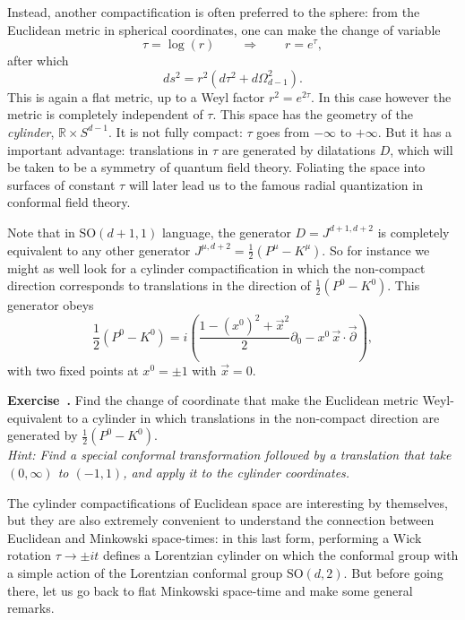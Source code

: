 \documentclass[a4paper,12pt]{article}
\numberwithin{equation}{section}
\newcounter{exercise}[section]
\newenvironment{exercise}[1][]%
	{\refstepcounter{exercise}\bigskip
	\begin{mdframed}[backgroundcolor=gray!20, linewidth=0]
	\noindent\textbf{Exercise~\thesection.\theexercise #1} \rmfamily}
  	{\end{mdframed}\bigskip}
\newcommand\hint[1]{\emph{Hint: #1}}
\begin{document}
Instead, another compactification is often preferred to the sphere: from the Euclidean metric in spherical coordinates, one can make the change of variable
\begin{equation}
	\tau = \log(r)
	\qquad\Rightarrow\qquad
	r = e^\tau,
\end{equation}
after which
\begin{equation}
	ds^2 = r^2 \left( d\tau^2 + d\Omega_{d-1}^2 \right).
\end{equation}
This is again a flat metric, up to a Weyl factor $r^2 = e^{2\tau}$. In this case however the metric is completely independent of $\tau$.
This space has the geometry of the \emph{cylinder}, $\mathds{R} \times S^{d-1}$. It is not fully compact: $\tau$ goes from $-\infty$ to $+\infty$. But it has a important advantage: translations in $\tau$ are generated by dilatations $D$, which will be taken to be a symmetry of quantum field theory. Foliating the space into surfaces of constant $\tau$ will later lead us to the famous radial quantization in conformal field theory.

Note that in $\text{SO}(d + 1, 1)$ language, the generator $D = J^{d+1, d+2}$ is completely equivalent to any other generator $J^{\mu, d+2} = \frac{1}{2} \left( P^\mu - K^\mu \right)$. So for instance we might as well look for a cylinder compactification in which the non-compact direction corresponds to translations in the direction of
$\frac{1}{2} \left( P^0 - K^0 \right)$. This generator obeys
\begin{equation}
	\frac{1}{2} \left( P^0 - K^0 \right)
	= i \left( \frac{1 - (x^0)^2 + \vec{x}^2}{2} \partial_0
	- x^0 \, \vec{x} \cdot \vec{\partial} \right),
\end{equation}
with two fixed points at $x^0 = \pm 1$ with $\vec{x} = 0$.

\begin{exercise}
	Find the change of coordinate that make the Euclidean metric Weyl-equivalent to a cylinder in which translations in the non-compact direction are generated by $\frac{1}{2} \left( P^0 - K^0 \right)$. \\
	\hint{Find a special conformal transformation followed by a translation that take $(0, \infty)$ to $(-1, 1)$, and apply it to the cylinder coordinates.}
\end{exercise}

The cylinder compactifications of Euclidean space are interesting by themselves, but they are also extremely convenient to understand the connection between Euclidean and Minkowski space-times: in this last form, performing a Wick rotation $\tau \to \pm i t$ defines a Lorentzian cylinder on which the conformal group with a simple action of the Lorentzian conformal group $\text{SO}(d, 2)$. 
But before going there, let us go back to flat Minkowski space-time and make some general remarks.
\end{document}

